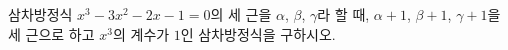 삼차방정식 $x^3-3x^2-2x-1=0$의 세 근을 $\alpha$, $\beta$, $\gamma$라 할 때, $\alpha+1$, $\beta+1$, $\gamma+1$을 세 근으로 하고 $x^3$의 계수가 $1$인 삼차방정식을 구하시오.

